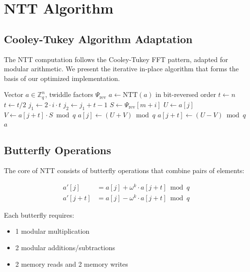 \section{NTT Algorithm}


\subsection{Cooley-Tukey Algorithm Adaptation}

The NTT computation follows the Cooley-Tukey FFT pattern, adapted for modular arithmetic. We present the iterative in-place algorithm that forms the basis of our optimized implementation.

\begin{algorithm}
\caption{Forward NTT (Iterative In-Place)}
\begin{algorithmic}[1]
\REQUIRE Vector $a \in \mathbb{Z}_q^n$, twiddle factors $\Psi_{\text{rev}}$
\ENSURE $a \leftarrow \text{NTT}(a)$ in bit-reversed order
\STATE $t \leftarrow n$
    \STATE $t \leftarrow t / 2$
        \STATE $j_1 \leftarrow 2 \cdot i \cdot t$
        \STATE $j_2 \leftarrow j_1 + t - 1$
        \STATE $S \leftarrow \Psi_{\text{rev}}[m + i]$
            \STATE $U \leftarrow a[j]$
            \STATE $V \leftarrow a[j + t] \cdot S \bmod q$
            \STATE $a[j] \leftarrow (U + V) \bmod q$
            \STATE $a[j + t] \leftarrow (U - V) \bmod q$
        \ENDFOR
    \ENDFOR
\ENDFOR
\RETURN $a$
\end{algorithmic}
\end{algorithm}

\subsection{Butterfly Operations}

The core of NTT consists of butterfly operations that combine pairs of elements:

\begin{align}
a'[j] &= a[j] + \omega^k \cdot a[j + t] \bmod q \\
a'[j + t] &= a[j] - \omega^k \cdot a[j + t] \bmod q
\end{align}

Each butterfly requires:
\begin{itemize}
\item 1 modular multiplication
\item 2 modular additions/subtractions
\item 2 memory reads and 2 memory writes
\end{itemize}

